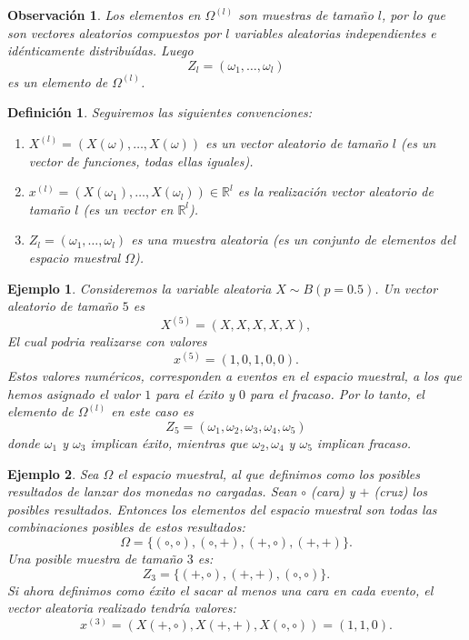\documentclass{report}
\newtheorem{dfn}{Definición}[section]
\newtheorem{obs}{Observación}[section]
\newtheorem{ej}{Ejemplo}[section]
\begin{document}
\begin{obs}
Los elementos en  \( \Omega^{(l)} \) son muestras de tamaño $l$, por lo que son vectores
aleatorios compuestos por $l$ variables aleatorias independientes e idénticamente distribuídas.
Luego
$$
Z_l = (\omega_1, \ldots, \omega_l)
$$
es un elemento de \( \Omega^{(l)} \).
\end{obs}

\begin{dfn}
Seguiremos las siguientes convenciones:
\begin{enumerate}
    \item $X^{(l)} = (X(\omega),\ldots,X(\omega))$ es un vector aleatorio de tamaño $l$ (es un vector de funciones, todas ellas iguales).
    \item $x^{(l)} = (X(\omega_1),\ldots,X(\omega_l)) \in \mathbb{R}^l$ es la realización vector aleatorio de tamaño $l$ (es un vector en $\mathbb{R}^l$).
    \item $Z_l = (\omega_1,\ldots,\omega_l)$ es una muestra aleatoria (es un conjunto de elementos del espacio muestral $\Omega$).
\end{enumerate}
\end{dfn}

\begin{ej}
    Consideremos la variable aleatoria $X\sim B(p=0.5)$. Un vector aleatorio de tamaño $5$ es
    $$
    X^{(5)} = (X,X,X,X,X),
    $$
    El cual podria realizarse con valores
    $$
    x^{(5)} = (1,0,1,0,0).
    $$
    Estos valores numéricos, corresponden a eventos en el espacio muestral, a los que hemos asignado el valor $1$
    para el éxito y $0$ para el fracaso. Por lo tanto, el elemento de $\Omega^{(l)}$ en este caso es
    $$
    Z_{5}=(\omega_1, \omega_2, \omega_3, \omega_4, \omega_5)
    $$
    donde $\omega_1$ y $\omega_3$ implican éxito, mientras que $\omega_2, \omega_4$ y $\omega_5$ implican fracaso.
\end{ej}

\begin{ej}
    Sea $\Omega$ el espacio muestral, al que definimos como los posibles resultados de lanzar dos monedas no cargadas. Sean $\circ$ (cara) y $+$ (cruz)
    los posibles resultados. Entonces los elementos del espacio muestral son todas las combinaciones posibles de estos resultados:
    $$
        \Omega = \{(\circ,\circ), (\circ,+),(+,\circ),(+,+)\}.
    $$
    Una posible muestra de tamaño $3$ es:
    $$
        Z_{3} = \{(+,\circ),(+,+), (\circ,\circ)\}.
    $$
    Si ahora definimos como \emph{éxito} el sacar al menos una cara en cada evento, el vector aleatoria realizado tendría valores:
    $$
        x^{(3)} = (X(+,\circ), X(+,+), X(\circ,\circ)) = (1,1,0).
    $$
\end{ej}
\end{document}
